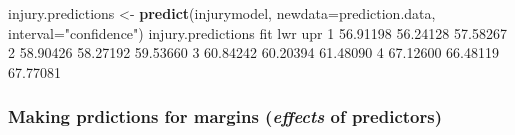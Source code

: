 \documentclass[]{article}
\newenvironment{Shaded}{\begin{snugshade}}{\end{snugshade}}
\newcommand{\DataTypeTok}[1]{\textcolor[rgb]{0.13,0.29,0.53}{#1}}
\newcommand{\DecValTok}[1]{\textcolor[rgb]{0.00,0.00,0.81}{#1}}
\newcommand{\FloatTok}[1]{\textcolor[rgb]{0.00,0.00,0.81}{#1}}
\newcommand{\KeywordTok}[1]{\textcolor[rgb]{0.13,0.29,0.53}{\textbf{#1}}}
\newcommand{\NormalTok}[1]{#1}
\newcommand{\StringTok}[1]{\textcolor[rgb]{0.31,0.60,0.02}{#1}}
\begin{document}
\begin{Shaded}
\begin{Highlighting}[]
\NormalTok{injury.predictions <-}\StringTok{ }\KeywordTok{predict}\NormalTok{(injurymodel, }\DataTypeTok{newdata=}\NormalTok{prediction.data, }\DataTypeTok{interval=}\StringTok{"confidence"}\NormalTok{)}
\NormalTok{injury.predictions}
\NormalTok{       fit      lwr      upr}
\DecValTok{1} \FloatTok{56.91198} \FloatTok{56.24128} \FloatTok{57.58267}
\DecValTok{2} \FloatTok{58.90426} \FloatTok{58.27192} \FloatTok{59.53660}
\DecValTok{3} \FloatTok{60.84242} \FloatTok{60.20394} \FloatTok{61.48090}
\DecValTok{4} \FloatTok{67.12600} \FloatTok{66.48119} \FloatTok{67.77081}
\end{Highlighting}
\end{Shaded}

\hypertarget{making-prdictions-for-margins-effects-of-predictors}{%
\subsubsection*{\texorpdfstring{Making prdictions for margins (\emph{effects} of predictors)}{Making prdictions for margins (effects of predictors)}}\label{making-prdictions-for-margins-effects-of-predictors}}
\end{document}
